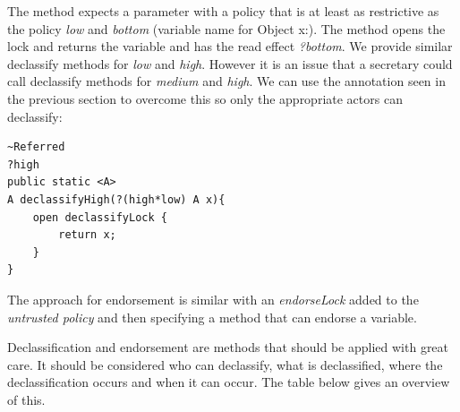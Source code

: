 The method expects a parameter with a policy that is at least as restrictive as the policy \emph{low} and \emph{bottom} (variable name for {Object x:}). The method opens the lock and returns the variable and has the read effect \emph{?bottom}.  We provide similar declassify methods for \emph{low} and \emph{high}. However it is an issue that a secretary could call declassify methods for \emph{medium} and \emph{high}. We can use the annotation seen in the previous section to overcome this so only the appropriate actors can declassify:

\begin{lstlisting}
~Referred
?high
public static <A> 
A declassifyHigh(?(high*low) A x){
	open declassifyLock {
		return x;
	}
}
\end{lstlisting}

The approach for endorsement is similar with an \emph{endorseLock} added to the \emph{untrusted policy} and then specifying a method that can endorse a variable.

Declassification and endorsement are methods that should be applied with great care. It should be considered who can declassify, what is declassified, where the declassification occurs and when it can occur. The table below gives an overview of this.

